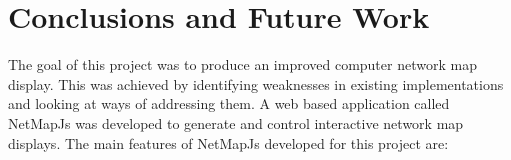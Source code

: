 \documentclass[11pt, a4paper]{report}
\begin{document}

\chapter{Conclusions and Future Work}
\label{sec:conclusion}

  
  


The goal of this project was to produce an improved computer network map
display. This was achieved by identifying weaknesses in existing implementations
and looking at ways of addressing them. A web based application called NetMapJs
was developed to generate and control interactive network map displays. The main
features of NetMapJs developed for this project are:
\end{document}
